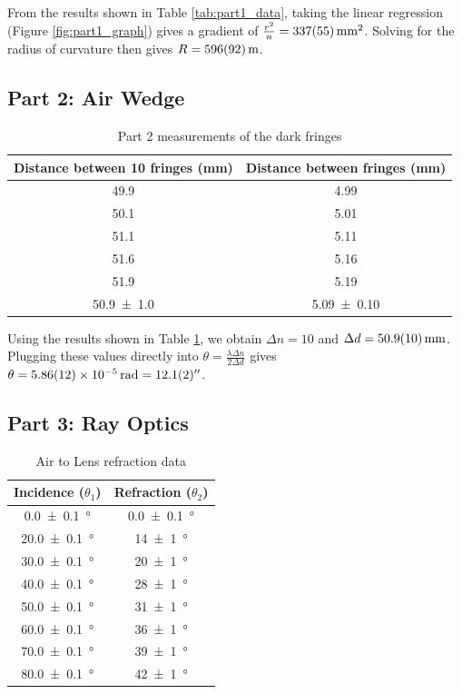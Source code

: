 \documentclass[a4paper]{scrartcl}
\begin{document}
From the results shown in Table \ref{tab:part1_data}, taking the linear regression (Figure \ref{fig:part1_graph}) gives a gradient of \(\frac{r^2}{n} = \SI{337 \pm 55}{\milli\metre\squared}\). Solving for the radius of curvature then gives \(R = \SI{596 \pm 92}{\metre}\).

\subsection{Part 2: Air Wedge}
\begin{table}
    \centering
    \begin{tabular}{c | c}
        Distance between 10 fringes (\si{\milli\metre}) & Distance between fringes (\si{\milli\metre}) \\
        \hline
        49.9 & 4.99 \\
        50.1 & 5.01 \\
        51.1 & 5.11 \\
        51.6 & 5.16 \\
        51.9 & 5.19 \\
        \hdashline
        \SI{50.9 \pm 1.0}{} & \SI{5.09 \pm 0.10}{} \\
        \hline
    \end{tabular}
    \caption{Part 2 measurements of the dark fringes}
    \label{tab:part2_data}
\end{table}

Using the results shown in Table \ref{tab:part2_data}, we obtain \(\Delta n = 10\) and \(\Delta d = \SI{50.9 \pm 1.0}{\milli\metre}\). Plugging these values directly into \(\theta = \frac{\lambda \Delta n}{2 \Delta d}\) gives \(\theta = \SI{5.86 \pm 0.12e-5}{\radian} = \SI{12.1 \pm 0.2}{\arcsecond}\).

\subsection{Part 3: Ray Optics}
\begin{table}
    \centering
    \begin{tabular}{c | c}
        Incidence (\(\theta_1\)) & Refraction (\(\theta_2\)) \\
        \hline
        \SI{0.0 \pm 0.1}{\degree} & \SI{0.0 \pm 0.1}{\degree} \\
        \SI{20.0 \pm 0.1}{\degree} & \SI{14 \pm 1}{\degree} \\
        \SI{30.0 \pm 0.1}{\degree} & \SI{20 \pm 1}{\degree} \\
        \SI{40.0 \pm 0.1}{\degree} & \SI{28 \pm 1}{\degree} \\
        \SI{50.0 \pm 0.1}{\degree} & \SI{31 \pm 1}{\degree} \\
        \SI{60.0 \pm 0.1}{\degree} & \SI{36 \pm 1}{\degree} \\
        \SI{70.0 \pm 0.1}{\degree} & \SI{39 \pm 1}{\degree} \\
        \SI{80.0 \pm 0.1}{\degree} & \SI{42 \pm 1}{\degree} \\
        \hline
    \end{tabular}
    \caption{Air to Lens refraction data}
    \label{tab:part3_data}
\end{table}
\end{document}
